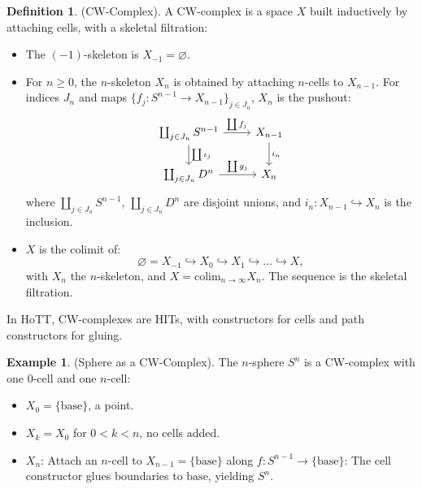 \documentclass{article}
\theoremstyle{definition}
\newtheorem{definition}{Definition}
\newtheorem{example}{Example}
\newcommand*{\incmap}{\hookrightarrow}
\begin{document}
\begin{definition} (CW-Complex). A CW-complex is a space \( X \)
built inductively by attaching cells, with a skeletal
filtration:
\begin{itemize}
    \item The \((-1)\)-skeleton is \( X_{-1} = \varnothing \).
    \item For \( n \geq 0 \), the \( n \)-skeleton \( X_n \) is
      obtained by attaching \( n \)-cells to \( X_{n-1} \). For
      indices \( J_n \) and maps \( \{ f_j : S^{n-1} \to X_{n-1}
      \}_{j \in J_n} \), \( X_n \) is the pushout:
    \[
    \begin{tikzcd}
    \coprod_{j \in J_n} S^{n-1} \arrow[r, "\coprod f_j"] \arrow[d, "\coprod \iota_j"] & X_{n-1} \arrow[d, "i_n"] \\
    \coprod_{j \in J_n} D^n \arrow[r, "\coprod g_j"] & X_n
    \end{tikzcd}
    \]
    where \( \coprod_{j \in J_n} S^{n-1} \), \( \coprod_{j \in
    J_n} D^n \) are disjoint unions, and \( i_n : X_{n-1}
    \incmap X_n \) is the inclusion.
    \item \( X \) is the colimit of:
    \[
    \varnothing = X_{-1} \incmap X_0 \incmap X_1 \incmap \dots
    \incmap X,
    \]
    with \( X_n \) the \( n \)-skeleton, and \( X = \text{colim}_{n
    \to \infty} X_n \). The sequence is the skeletal filtration.
\end{itemize}
In HoTT, CW-complexes are HITs, with constructors for cells and
path constructors for gluing.
\end{definition}\begin{example} (Sphere as a CW-Complex). The \( n \)-sphere
\( S^n \) is a CW-complex with one 0-cell and one \( n \)-cell:
\begin{itemize}
    \item \( X_0 = \{ \text{base} \} \), a point.
    \item \( X_k = X_0 \) for \( 0 < k < n \), no cells added.
    \item \( X_n \): Attach an \( n \)-cell to \( X_{n-1} =
      \{ \text{base} \} \) along \( f : S^{n-1} \to
      \{ \text{base} \} \):
    The \( \text{cell} \) constructor glues boundaries to
    \( \text{base} \), yielding \( S^n \).
\end{itemize}
\end{example}
\end{document}
